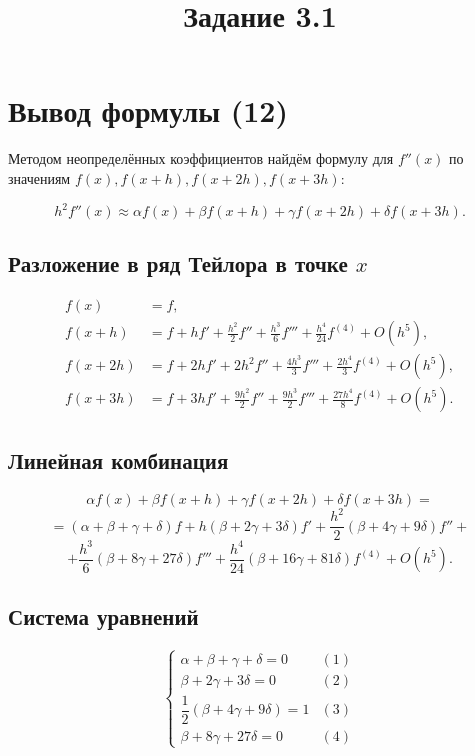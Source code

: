 \documentclass[a4paper,12pt]{article}
\title{Задание 3.1}
\author{}
\date{}
\begin{document}
	
	\maketitle
	
	\section*{Вывод формулы (12)}
	
	Методом неопределённых коэффициентов найдём формулу для \( f''(x) \) по значениям 
	\( f(x), f(x+h), f(x+2h), f(x+3h) \):
	
	\[
	{h^2}f''(x) \approx \alpha f(x) + \beta f(x+h) + \gamma f(x+2h) + \delta f(x+3h).
	\]
	
	\subsection*{Разложение в ряд Тейлора в точке \( x \)}
	\[
	\begin{aligned}
		f(x) &= f, \\
		f(x+h) &= f + hf' + \frac{h^2}{2}f'' + \frac{h^3}{6}f''' + \frac{h^4}{24}f^{(4)} + O(h^5), \\
		f(x+2h) &= f + 2hf' + 2h^2f'' + \frac{4h^3}{3}f''' + \frac{2h^4}{3}f^{(4)} + O(h^5), \\
		f(x+3h) &= f + 3hf' + \frac{9h^2}{2}f'' + \frac{9h^3}{2}f''' + \frac{27h^4}{8}f^{(4)} + O(h^5).
	\end{aligned}
	\]
	
	\subsection*{Линейная комбинация}
	\[
	\alpha f(x) + \beta f(x+h) + \gamma f(x+2h) + \delta f(x+3h) =
	\]
	\[
	= (\alpha + \beta + \gamma + \delta)f +
	h(\beta + 2\gamma + 3\delta)f' +
	\frac{h^2}{2}(\beta + 4\gamma + 9\delta)f'' +
	\]
	\[
	+ \frac{h^3}{6}(\beta + 8\gamma + 27\delta)f''' +
	\frac{h^4}{24}(\beta + 16\gamma + 81\delta)f^{(4)} + O(h^5).
	\]
	
	\subsection*{Система уравнений}
	\[
	\begin{cases}
		\alpha + \beta + \gamma + \delta = 0 & (1) \\[4pt]
		\beta + 2\gamma + 3\delta = 0 & (2) \\[4pt]
		\dfrac{1}{2}(\beta + 4\gamma + 9\delta) = 1 & (3) \\[4pt]
		\beta + 8\gamma + 27\delta = 0 & (4)
	\end{cases}
	\]
	
\end{document}
